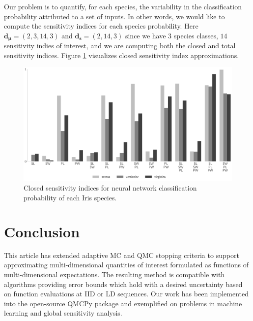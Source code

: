 \documentclass[graybox]{svmult}
\begin{document}
Our problem is to quantify, for each species, the variability in the classification probability attributed to a set of inputs. In other words, we would like to compute the sensitivity indices for each species probability. 
Here $\boldsymbol{d}_{\boldsymbol{\mu}} = (2,3,14,3)$ and $\boldsymbol{d}_{\boldsymbol{s}} = (2,14,3)$ since we have $3$ species classes, $14$ sensitivity indies of interest, and we are computing both the closed and total sensitivity indices. Figure \ref{SoRa_fig:nn_si} visualizes closed sensitivity index approximations. 
%

\begin{figure}[t]
    \centering
    \includegraphics[width=.8\textwidth]{figs/nn_si.pdf}
    \caption{Closed sensitivity indices for neural network classification probability of each Iris species.}
    \label{SoRa_fig:nn_si}
\end{figure}

\section{Conclusion} \label{SoRa_sec:conclusions}

This article has extended adaptive MC and QMC stopping criteria to support approximating multi-dimensional quantities of interest formulated as functions of multi-dimensional expectations. The resulting method is compatible with algorithms providing error bounds which hold with a desired uncertainty based on function evaluations at IID or LD sequences. Our work has been implemented into the open-source QMCPy package and exemplified on problems in machine learning and global sensitivity analysis. 
\end{document}
